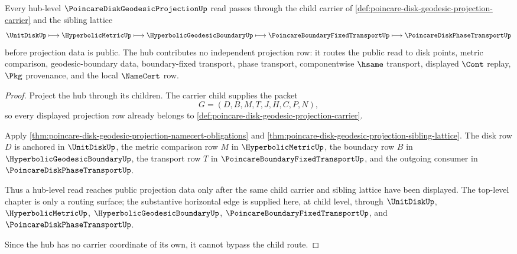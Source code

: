 \begin{theorem}
\label{thm:poincare-disk-geodesic-projection-hub-sibling-route}
Every hub-level $\PoincareDiskGeodesicProjectionUp$ read passes through the child carrier of \autoref{def:poincare-disk-geodesic-projection-carrier} and the sibling lattice
$$
\UnitDiskUp \longmapsto \HyperbolicMetricUp \longmapsto \HyperbolicGeodesicBoundaryUp \longmapsto \PoincareBoundaryFixedTransportUp \longmapsto \PoincareDiskPhaseTransportUp
$$
before projection data is public. The hub contributes no independent projection row: it routes the public read to disk points, metric comparison, geodesic-boundary data, boundary-fixed transport, phase transport, componentwise $\hsame$ transport, displayed $\Cont$ replay, $\Pkg$ provenance, and the local $\NameCert$ row.
\end{theorem}
\begin{proof}
Project the hub through its children. The carrier child supplies the packet
$$
G=(D,B,M,T,J,H,C,P,N),
$$
so every displayed projection row already belongs to \autoref{def:poincare-disk-geodesic-projection-carrier}.

Apply \autoref{thm:poincare-disk-geodesic-projection-namecert-obligations} and \autoref{thm:poincare-disk-geodesic-projection-sibling-lattice}. The disk row $D$ is anchored in $\UnitDiskUp$, the metric comparison row $M$ in $\HyperbolicMetricUp$, the boundary row $B$ in $\HyperbolicGeodesicBoundaryUp$, the transport row $T$ in $\PoincareBoundaryFixedTransportUp$, and the outgoing consumer in $\PoincareDiskPhaseTransportUp$.

Thus a hub-level read reaches public projection data only after the same child carrier and sibling lattice have been displayed. The top-level chapter is only a routing surface; the substantive horizontal edge is supplied here, at child level, through $\UnitDiskUp$, $\HyperbolicMetricUp$, $\HyperbolicGeodesicBoundaryUp$, $\PoincareBoundaryFixedTransportUp$, and $\PoincareDiskPhaseTransportUp$.

Since the hub has no carrier coordinate of its own, it cannot bypass the child route.
\end{proof}
